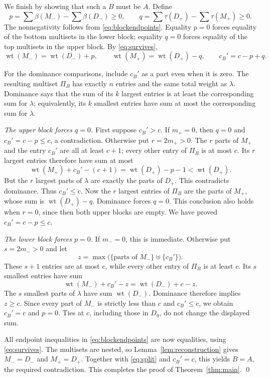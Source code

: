 \documentclass[11pt]{amsart}
\newcommand{\wt}{\operatorname{wt}}
\newcommand{\tops}{\tau}
\newcommand{\bots}{\beta}
\newcommand{\un}{\uplus}
\begin{document}
We finish by showing that such a $B$ must be $A$. Define
\[
 p=\sum\bots(M_-)-\sum\bots(D_-)\ge0,
 \qquad
 q=\sum\tops(D_+)-\sum\tops(M_+)\ge0.
\]
The nonnegativity follows from \eqref{eq:blockendpoints}. Equality
$p=0$ forces equality of the bottom multisets in the lower block;
equality $q=0$ forces equality of the top multisets in the upper block.
By \eqref{eq:survives},
\begin{equation}\label{eq:weights}
 \wt(M_-)=\wt(D_-)+p,\qquad
 \wt(M_+)=\wt(D_+)-q,\qquad
 c_B'=c-p+q.
\end{equation}

For the dominance comparisons, include $c_B'$ as a part even when it
is zero. The resulting multiset $\Pi_B$ has exactly $n$ entries and
the same total weight as $\lambda$. Dominance says that the sum of
its $k$ largest entries is at least the corresponding sum for
$\lambda$; equivalently, its $k$ smallest entries have sum at most
the corresponding sum for $\lambda$.

\smallskip\noindent\emph{The upper block forces $q=0$.}
First suppose $c_B'>c$. If $m_+=0$, then $q=0$ and
$c_B'=c-p\le c$, a contradiction. Otherwise put $r=2m_+>0$.
The $r$ parts of $M_+$ and the entry $c_B'$ are all at least $c+1$;
every other entry of $\Pi_B$ is at most $c$. Its $r$ largest entries
therefore have sum at most
\[
 \wt(M_+)+c_B'-(c+1)
 =\wt(D_+)-p-1<\wt(D_+).
\]
But the $r$ largest parts of $\lambda$ are exactly the parts of $D_+$.
This contradicts dominance. Thus $c_B'\le c$.
Now the $r$ largest entries of $\Pi_B$ are the parts of $M_+$,
whose sum is $\wt(D_+)-q$. Dominance forces $q=0$.
This conclusion also holds when $r=0$, since then both upper blocks
are empty. We have proved $c_B'=c-p\le c$.

\smallskip\noindent\emph{The lower block forces $p=0$.}
If $m_-=0$, this is immediate. Otherwise put $s=2m_->0$ and let
\[
 z=\max\bigl(\{\text{parts of }M_-\}\un\{c_B'\}\bigr).
\]
These $s+1$ entries are at most $c$, while every other entry of
$\Pi_B$ is at least $c$. Its $s$ smallest entries have sum
\[
 \wt(M_-)+c_B'-z=\wt(D_-)+c-z.
\]
The $s$ smallest parts of $\lambda$ have sum $\wt(D_-)$. Dominance
therefore implies $z\ge c$. Since every part of $M_-$ is strictly
less than $c$ and $c_B'\le c$, we obtain $c_B'=c$ and $p=0$.
Ties at $c$, including those in $D_0$, do not change the displayed sum.

All endpoint inequalities in \eqref{eq:blockendpoints} are now
equalities, using \eqref{eq:survives}. The multisets are nested, so
Lemma~\ref{lem:reconstruction} gives $M_-=D_-$ and $M_+=D_+$.
Together with \eqref{eq:split} and $c_B'=c$, this yields $B=A$,
the required contradiction. This completes the proof of
Theorem~\ref{thm:main}. \qed
\end{document}
